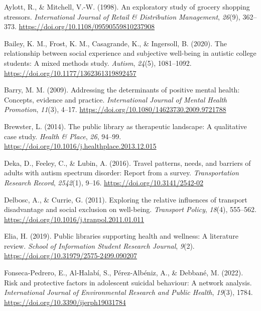 \documentclass[
  letterpaper,
  number,
  review,
  3p]{elsarticle}
\newlength{\cslhangindent}
\newenvironment{CSLReferences}[2] %
 {\begin{list}{}{%
  \setlength{\itemindent}{0pt}
  \setlength{\leftmargin}{0pt}
  \setlength{\parsep}{0pt}
  \ifodd #1
   \setlength{\leftmargin}{\cslhangindent}
   \setlength{\itemindent}{-1\cslhangindent}
  \fi
  \setlength{\itemsep}{#2\baselineskip}}}
 {\end{list}}
\begin{document}
\label{refs}
\begin{CSLReferences}{1}{0}
Aylott, R., \& Mitchell, V.-W. (1998). An exploratory study of grocery
shopping stressors. \emph{International Journal of Retail \&
Distribution Management}, \emph{26}(9), 362--373.
\url{https://doi.org/10.1108/09590559810237908}

Bailey, K. M., Frost, K. M., Casagrande, K., \& Ingersoll, B. (2020).
The relationship between social experience and subjective well-being in
autistic college students: {A} mixed methods study. \emph{Autism},
\emph{24}(5), 1081--1092. \url{https://doi.org/10.1177/1362361319892457}

Barry, M. M. (2009). Addressing the determinants of positive mental
health: {Concepts}, evidence and practice. \emph{International Journal
of Mental Health Promotion}, \emph{11}(3), 4--17.
\url{https://doi.org/10.1080/14623730.2009.9721788}

Brewster, L. (2014). The public library as therapeutic landscape: {A}
qualitative case study. \emph{Health \& Place}, \emph{26}, 94--99.
\url{https://doi.org/10.1016/j.healthplace.2013.12.015}

Deka, D., Feeley, C., \& Lubin, A. (2016). Travel patterns, needs, and
barriers of adults with autism spectrum disorder: {Report} from a
survey. \emph{Transportation Research Record}, \emph{2542}(1), 9--16.
\url{https://doi.org/10.3141/2542-02}

Delbosc, A., \& Currie, G. (2011). Exploring the relative influences of
transport disadvantage and social exclusion on well-being.
\emph{Transport Policy}, \emph{18}(4), 555--562.
\url{https://doi.org/10.1016/j.tranpol.2011.01.011}

Elia, H. (2019). Public libraries supporting health and wellness: {A}
literature review. \emph{School of Information Student Research
Journal}, \emph{9}(2). \url{https://doi.org/10.31979/2575-2499.090207}

Fonseca-Pedrero, E., Al-Halabí, S., Pérez-Albéniz, A., \& Debbané, M.
(2022). Risk and protective factors in adolescent suicidal behaviour:
{A} network analysis. \emph{International Journal of Environmental
Research and Public Health}, \emph{19}(3), 1784.
\url{https://doi.org/10.3390/ijerph19031784}


\end{CSLReferences}
\end{document}
